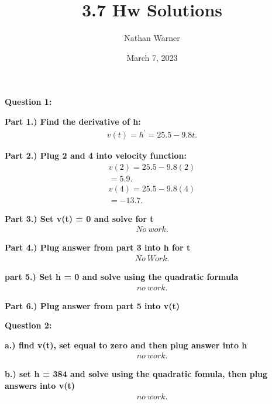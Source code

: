 \documentclass{report}
\title{\Huge{3.7 Hw Solutions}}
\author{\huge{Nathan Warner}}
\date{\huge{March 7, 2023}}
\begin{document}
    \maketitle
    \begin{Large}
        \noindent \textbf{Question 1:}
    \end{Large}
    \bigbreak \noindent 
    \bigbreak \noindent 
    \textbf{Part 1.) Find the derivative of h:}
    \begin{align*}
      v(t) = h^{\prime} = 25.5 -9.8t
    .\end{align*}

    \bigbreak \noindent 
    \textbf{Part 2.) Plug 2 and 4 into velocity function:}
    \begin{align*}
      v(2) = 25.5-9.8(2) \\
      =5.9
    .\end{align*}
    \begin{align*}
      v(4) = 25.5 - 9.8(4) \\
      =-13.7
    .\end{align*}

    \bigbreak \noindent 
    \textbf{Part 3.) Set v(t) = 0 and solve for t}
    \begin{align*}
      No\ work 
    .\end{align*}

    \bigbreak \noindent 
    \textbf{Part 4.) Plug answer from part 3 into h for t}
    \begin{align*}
      No\ Work
    .\end{align*}

    \bigbreak \noindent 
    \textbf{part 5.) Set h = 0 and solve using the quadratic formula}
    \begin{align*}
      no\ work
    .\end{align*}

    \bigbreak \noindent 
    \textbf{Part 6.) Plug answer from part 5 into v(t)}

    \bigbreak \noindent \bigbreak \noindent 
    \begin{Large}
        \textbf{Question 2:}
    \end{Large}
    \bigbreak \noindent 
    \bigbreak \noindent 
    \textbf{a.) find v(t), set equal to zero and then plug answer into h}
    \begin{align*}
      no\ work
    .\end{align*}

    \bigbreak \noindent 
    \textbf{b.) set h = 384 and solve using the quadratic fomula, then plug answers into v(t)}
    \begin{align*}
      no\ work
    .\end{align*}
\end{document}
